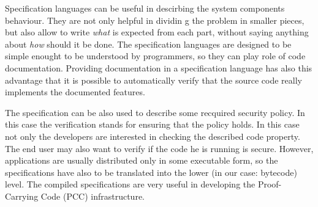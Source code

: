 \documentclass{acm_proc_article-sp}
\begin{document}
Specification languages can be useful in descirbing the system components behaviour. They are not only helpful in dividin g the problem in smaller pieces, but also allow to write \textit{what} is expected from each part, without saying anything about \textit{how} should it be done. The specification languages are designed to be simple enought to be understood by programmers, so they can play role of code documentation. Providing documentation in a specification language has also this advantage that it is possible to automatically verify that the source code really implements the documented features.

The specification can be also used to describe some recquired security policy. In this case the verification stands for ensuring that the policy holds. In this case not only the developers are interested in checking the described code property. The end user may also want to verify if the code he is running is secure. However, applications are usually distributed only in some executable form, so the specifications have also to be translated into the lower (in our case: bytecode) level. The compiled specifications are very useful in developing the Proof-Carrying Code (PCC) infrastructure.
\end{document}
